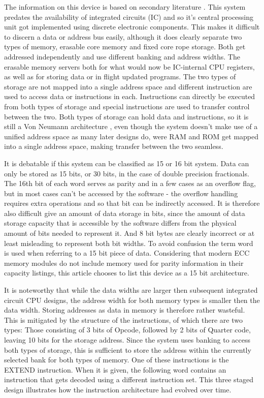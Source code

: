 \documentclass[twoside,twocolumn]{article}
\begin{document}
The information on this device is based on secondary literature \cite{agc}. This system
predates the availability of integrated circuits (IC) and so it's central processing unit
got implemented using discrete electronic components. This makes it difficult to discern
a data or address bus easily, although it does clearly separate two types of memory,
erasable core memory and fixed core rope storage. Both get addressed independently and
use different banking and address widths. The erasable memory servers both for what would
now be IC-internal CPU registers, as well as for storing data or in flight updated
programs. The two types of storage are not mapped into a single address space and
different instruction are used to access data or instructions in each. Instructions can
directly be executed from both types of storage and special instructions are used to
transfer control between the two. Both types of storage can hold data and instructions,
so it is still a Von Neumann architecture \cite{edvac}, even though the system doesn't
make use of a unified address space as many later designs do, were RAM and ROM get mapped
into a single address space, making transfer between the two seamless.

It is debatable if this system can be classified as 15 or 16 bit system. Data can only be
stored as 15 bits, or 30 bits, in the case of double precision fractionals. The 16th bit
of each word serves as parity and in a few cases as an overflow flag, but in most cases
can't be accessed by the software - the overflow handling requires extra operations and
so that bit can be indirectly accessed. It is therefore also difficult give an amount of
data storage in bits, since the amount of data storage capacity that is accessible by the
software differs from the physical amount of bits needed to represent it. And 8 bit bytes
are clearly incorrect or at least misleading to represent both bit widths. To avoid
confusion the term word is used when referring to a 15 bit piece of data. Considering
that modern ECC memory modules do not include memory used for parity information in their
capacity listings, this article chooses to list this device as a 15 bit architecture.

It is noteworthy that while the data widths are larger then subsequent integrated circuit
CPU designs, the address width for both memory types is smaller then the data width.
Storing addresses as data in memory is therefore rather wasteful. This is mitigated by
the structure of the instructions, of which there are two types: Those consisting of 3
bits of Opcode, followed by 2 bits of Quarter code, leaving 10 bits for the storage
address. Since the system uses banking to access both types of storage, this is
sufficient to store the address within the currently selected bank for both types of
memory. One of these instructions is the EXTEND instruction. When it is given, the
following word contains an instruction that gets decoded using a different instruction
set. This three staged design illustrates how the instruction architecture had evolved
over time.
\end{document}
